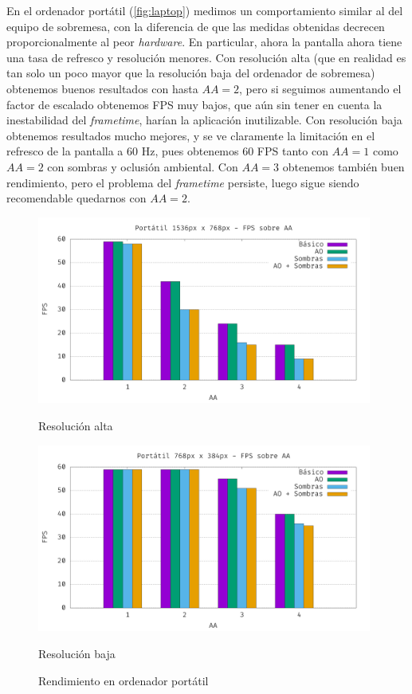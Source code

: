 En el ordenador portátil (\autoref{fig:laptop}) medimos un comportamiento similar al del equipo de sobremesa, con la diferencia de que las medidas obtenidas decrecen proporcionalmente al peor \textit{hardware}. En particular, ahora la pantalla ahora tiene una tasa de refresco y resolución menores. Con resolución alta (que en realidad es tan solo un poco mayor que la resolución baja del ordenador de sobremesa) obtenemos buenos resultados con hasta $AA=2$, pero si seguimos aumentando el factor de escalado obtenemos FPS muy bajos, que aún sin tener en cuenta la inestabilidad del \textit{frametime}, harían la aplicación inutilizable. Con resolución baja obtenemos resultados mucho mejores, y se ve claramente la limitación en el refresco de la pantalla a 60 Hz, pues obtenemos 60 FPS tanto con $AA=1$ como $AA=2$ con sombras y oclusión ambiental. Con $AA=3$ obtenemos también buen rendimiento, pero el problema del \textit{frametime} persiste, luego sigue siendo recomendable quedarnos con $AA=2$.\newline
\begin{figure}[!ht]
     \begin{minipage}[c]{\linewidth}
        \centering
        \includegraphics[width=0.98\textwidth]{Plantilla-TFG-master/img/graficas/LaptopHR.png}
        \caption{Resolución alta}
     \end{minipage}
     \begin{minipage}[c]{\linewidth}
        \centering
        \includegraphics[width=0.98\textwidth]{Plantilla-TFG-master/img/graficas/LaptopLR.png}
        \caption{Resolución baja}
     \end{minipage}
     \caption{Rendimiento en ordenador portátil}
     \label{fig:laptop}
\end{figure}

